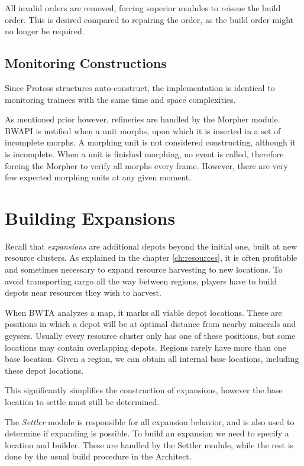 	All invalid orders are removed, forcing superior modules to reissue the build order. This is desired compared to repairing the order, as the build order might no longer be required.
	
	\subsection*{Monitoring Constructions}
	Since Protoss structures auto-construct, the implementation is identical to monitoring trainees with the same time and space complexities.
	
	As mentioned prior however, refineries are handled by the Morpher module. BWAPI is notified when a unit morphs, upon which it is inserted in a set of incomplete morphs. A morphing unit is not considered constructing, although it is incomplete. When a unit is finished morphing, no event is called, therefore forcing the Morpher to verify all morphs every frame. However, there are very few expected morphing units at any given moment.

\section{Building Expansions}
\label{sec:buildExpansions}
Recall that \emph{expansions} are additional depots beyond the initial one, built at new resource clusters. As explained in the chapter \ref{ch:resources}, it is often profitable and sometimes necessary to expand resource harvesting to new locations. To avoid transporting cargo all the way between regions, players have to build depots near resources they wish to harvest.

When BWTA analyzes a map, it marks all viable depot locations. These are positions in which a depot will be at optimal distance from nearby minerals and geysers. Usually every resource cluster only has one of these positions, but some locations may contain overlapping depots. Regions rarely have more than one base location. Given a region, we can obtain all internal base locations, including these depot locations.

This significantly simplifies the construction of expansions, however the base location to settle must still be determined.

The \emph{Settler} module is responsible for all expansion behavior, and is also used to determine if expanding is possible. To build an expansion we need to specify a location and builder. These are handled by the Settler module, while the rest is done by the usual build procedure in the Architect.

